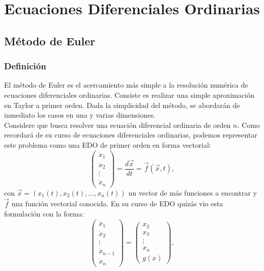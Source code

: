 \newpage
\section{Ecuaciones Diferenciales Ordinarias}
 \subsection{Método de Euler}
  \subsubsection{Definición}
 El método de Euler es el acercamiento más simple a la resolución numérica de 
  ecuaciones diferenciales ordinarias. Consiste es realizar una simple aproximación en Taylor a primer orden. Dada la simplicidad del método, se abordarán de inmediato los casos en una y varias dimensiones.\\
  Considere que busca resolver una ecuación diferencial ordinaria de orden $n$. Como recordará de su curso de ecuaciones diferenciales ordinarias, podemos representar este problema como una EDO de primer orden en forma vectorial: 
  \begin{equation}
   \begin{pmatrix}
     \dot{x}_1 \\
     \dot{x}_2 \\
     \vdots \\
     \dot{x}_n
   \end{pmatrix} = 
    \frac{d\vec{x}}{dt}
    = \vec{f}\left( \vec{x}, t \right), \label{eq: matrix_form}
  \end{equation}
  con $\vec{x} = \left( x_1(t), x_2(t), \dots, x_n(t) \right)$ un vector de más funciones a encontrar y $\vec{f}$ una función vectorial conocida. En su curso de EDO quizás vio esta formulación con la forma:
  \begin{equation}
  \begin{pmatrix}
     \dot{x}_1 \\
     \dot{x}_2 \\
     \vdots \\
     \dot{x}_{n-1}\\
     \dot{x}_n
   \end{pmatrix} = 
    \begin{pmatrix}
      x_2\\
      x_3 \\
     \vdots \\
      x_n \\
      g(x)
   \end{pmatrix}, 
  \end{equation}
